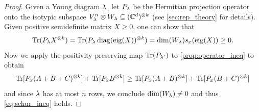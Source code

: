 \documentclass[notitlepage, 10pt]{article}
\begin{document}
\begin{proof}
    Given a Young diagram $\lambda$, let $P_{\lambda}$ be the Hermitian projection operator onto the isotypic subspace $V_{\lambda}^{n} \otimes W_{\lambda} \subseteq (\mathbb C^{d})^{\otimes k}$ (see \cref{sec:rep_theory} for details).
    Given positive semidefinite matrix $X \geq 0$, one can show that 
    \begin{equation}
        \operatorname{Tr}(P_{\lambda}X^{\otimes k}) = \operatorname{Tr}(P_{\lambda}\operatorname{diag}(\operatorname{eig}(X))^{\otimes k}) = \dim(W_{\lambda}) s_{x}(\operatorname{eig}(X)) \geq 0.
    \end{equation}
    Now we apply the positivity preserving map $\operatorname{Tr}(P_{\lambda} \cdot )$ to \cref{prop:operator_ineq} to obtain
    \begin{equation}
        \operatorname{Tr}[P_{x}(A+B+C)^{\otimes k}] + \operatorname{Tr}[P_{x}B^{\otimes k}] \geq \operatorname{Tr}[P_{x}(A+B)^{\otimes k}] + \operatorname{Tr}[P_{x}(B+C)^{\otimes k}]
    \end{equation}
    and since $\lambda$ has at most $n$ rows, we conclude $\dim(W_{\lambda}) \neq 0$ and thus \cref{eq:schur_ineq} holds.
\end{proof}
\end{document}
